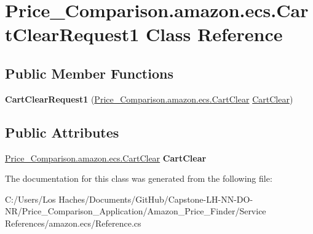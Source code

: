 \hypertarget{class_price___comparison_1_1amazon_1_1ecs_1_1_cart_clear_request1}{\section{Price\-\_\-\-Comparison.\-amazon.\-ecs.\-Cart\-Clear\-Request1 Class Reference}
\label{class_price___comparison_1_1amazon_1_1ecs_1_1_cart_clear_request1}
}
\subsection*{Public Member Functions}
\begin{DoxyCompactItemize}
\item 
\hypertarget{class_price___comparison_1_1amazon_1_1ecs_1_1_cart_clear_request1_ad89dd0b134c77897dd7213021e4efca3}{{\bfseries Cart\-Clear\-Request1} (\hyperlink{class_price___comparison_1_1amazon_1_1ecs_1_1_cart_clear}{Price\-\_\-\-Comparison.\-amazon.\-ecs.\-Cart\-Clear} \hyperlink{class_price___comparison_1_1amazon_1_1ecs_1_1_cart_clear}{Cart\-Clear})}\label{class_price___comparison_1_1amazon_1_1ecs_1_1_cart_clear_request1_ad89dd0b134c77897dd7213021e4efca3}

\end{DoxyCompactItemize}
\subsection*{Public Attributes}
\begin{DoxyCompactItemize}
\item 
\hypertarget{class_price___comparison_1_1amazon_1_1ecs_1_1_cart_clear_request1_a0a4061748b5a01d05b7bf110edb6117b}{\hyperlink{class_price___comparison_1_1amazon_1_1ecs_1_1_cart_clear}{Price\-\_\-\-Comparison.\-amazon.\-ecs.\-Cart\-Clear} {\bfseries Cart\-Clear}}\label{class_price___comparison_1_1amazon_1_1ecs_1_1_cart_clear_request1_a0a4061748b5a01d05b7bf110edb6117b}

\end{DoxyCompactItemize}


The documentation for this class was generated from the following file\-:\begin{DoxyCompactItemize}
\item 
C\-:/\-Users/\-Los Haches/\-Documents/\-Git\-Hub/\-Capstone-\/\-L\-H-\/\-N\-N-\/\-D\-O-\/\-N\-R/\-Price\-\_\-\-Comparison\-\_\-\-Application/\-Amazon\-\_\-\-Price\-\_\-\-Finder/\-Service References/amazon.\-ecs/Reference.\-cs\end{DoxyCompactItemize}
